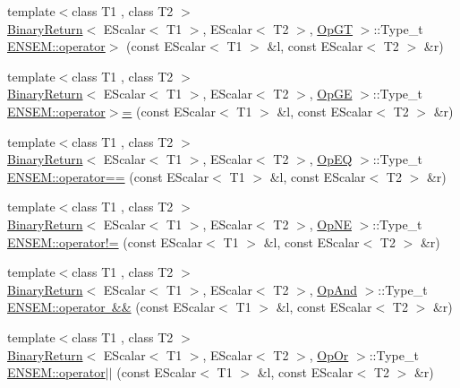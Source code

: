 \begin{DoxyCompactItemize}
\item 
{\footnotesize template$<$class T1 , class T2 $>$ }\\\mbox{\hyperlink{structBinaryReturn}{Binary\+Return}}$<$ E\+Scalar$<$ T1 $>$, E\+Scalar$<$ T2 $>$, \mbox{\hyperlink{structOpGT}{Op\+GT}} $>$\+::Type\+\_\+t \mbox{\hyperlink{group__escalar_ga92b83acdab0e4e35ee7687740b1d3a01}{E\+N\+S\+E\+M\+::operator$>$}} (const E\+Scalar$<$ T1 $>$ \&l, const E\+Scalar$<$ T2 $>$ \&r)
\item 
{\footnotesize template$<$class T1 , class T2 $>$ }\\\mbox{\hyperlink{structBinaryReturn}{Binary\+Return}}$<$ E\+Scalar$<$ T1 $>$, E\+Scalar$<$ T2 $>$, \mbox{\hyperlink{structOpGE}{Op\+GE}} $>$\+::Type\+\_\+t \mbox{\hyperlink{group__escalar_ga9635179278abcc85536b21baae58904d}{E\+N\+S\+E\+M\+::operator$>$=}} (const E\+Scalar$<$ T1 $>$ \&l, const E\+Scalar$<$ T2 $>$ \&r)
\item 
{\footnotesize template$<$class T1 , class T2 $>$ }\\\mbox{\hyperlink{structBinaryReturn}{Binary\+Return}}$<$ E\+Scalar$<$ T1 $>$, E\+Scalar$<$ T2 $>$, \mbox{\hyperlink{structOpEQ}{Op\+EQ}} $>$\+::Type\+\_\+t \mbox{\hyperlink{group__escalar_gaccee099471047aac753f8acd2336898c}{E\+N\+S\+E\+M\+::operator==}} (const E\+Scalar$<$ T1 $>$ \&l, const E\+Scalar$<$ T2 $>$ \&r)
\item 
{\footnotesize template$<$class T1 , class T2 $>$ }\\\mbox{\hyperlink{structBinaryReturn}{Binary\+Return}}$<$ E\+Scalar$<$ T1 $>$, E\+Scalar$<$ T2 $>$, \mbox{\hyperlink{structOpNE}{Op\+NE}} $>$\+::Type\+\_\+t \mbox{\hyperlink{group__escalar_ga4d3acce68f40c5503e1e30f756a1ed4c}{E\+N\+S\+E\+M\+::operator!=}} (const E\+Scalar$<$ T1 $>$ \&l, const E\+Scalar$<$ T2 $>$ \&r)
\item 
{\footnotesize template$<$class T1 , class T2 $>$ }\\\mbox{\hyperlink{structBinaryReturn}{Binary\+Return}}$<$ E\+Scalar$<$ T1 $>$, E\+Scalar$<$ T2 $>$, \mbox{\hyperlink{structOpAnd}{Op\+And}} $>$\+::Type\+\_\+t \mbox{\hyperlink{group__escalar_ga8ca8cd66f3b104a6439afa608f4a6e50}{E\+N\+S\+E\+M\+::operator \&\&}} (const E\+Scalar$<$ T1 $>$ \&l, const E\+Scalar$<$ T2 $>$ \&r)
\item 
{\footnotesize template$<$class T1 , class T2 $>$ }\\\mbox{\hyperlink{structBinaryReturn}{Binary\+Return}}$<$ E\+Scalar$<$ T1 $>$, E\+Scalar$<$ T2 $>$, \mbox{\hyperlink{structOpOr}{Op\+Or}} $>$\+::Type\+\_\+t \mbox{\hyperlink{group__escalar_gadede5cc3683f39a01170f32e3f759c8e}{E\+N\+S\+E\+M\+::operator$\vert$$\vert$}} (const E\+Scalar$<$ T1 $>$ \&l, const E\+Scalar$<$ T2 $>$ \&r)

\end{DoxyCompactItemize}
